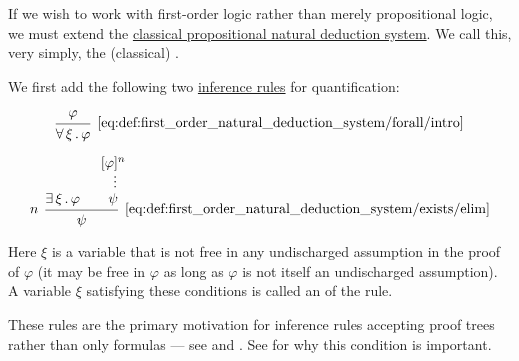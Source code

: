 \begin{definition}\label{def:first_order_natural_deduction_system}
  If we wish to work with first-order logic rather than merely propositional logic, we must extend the \hyperref[def:classical_propositional_deductive_systems]{classical propositional natural deduction system}. We call this, very simply, the (classical) .

  \begin{thmenum}
     We first add the following two \hyperref[def:judgment/inference_rule]{inference rules} for quantification:

    \begin{minipage}{0.45\textwidth}
      \begin{equation*}\taglabel[\( \forall^+ \)]{eq:def:first_order_natural_deduction_system/forall/intro}
        \begin{prooftree}
          \hypo{ \varphi }
          \infer1[\ref{eq:def:first_order_natural_deduction_system/forall/intro}]{ \qforall \xi \varphi }
        \end{prooftree}
      \end{equation*}
    \end{minipage}
    \hfill
    \begin{minipage}{0.45\textwidth}
      \begin{equation*}\taglabel[\( \exists^- \)]{eq:def:first_order_natural_deduction_system/exists/elim}
        \begin{prooftree}
          \hypo{ \qexists \xi \varphi }
          \hypo{ [\varphi]^n }
          \ellipsis {} { \psi }
          \infer[left label=\( n \)]2[\ref{eq:def:first_order_natural_deduction_system/exists/elim}]{ \psi }
        \end{prooftree}
      \end{equation*}
    \end{minipage}

    Here \( \xi \) is a variable that is not free in any undischarged assumption in the proof of \( \varphi \) (it may be free in \( \varphi \) as long as \( \varphi \) is not itself an undischarged assumption). A variable \( \xi \) satisfying these conditions is called an  of the rule.

    These rules are the primary motivation for inference rules accepting proof trees rather than only formulas --- see  and . See  for why this condition is important.


\end{thmenum}
\end{definition}
